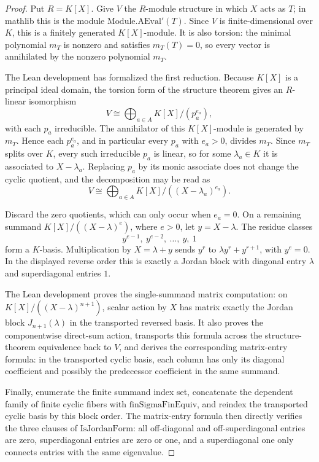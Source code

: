 \begin{proof}
  \leanok
  Put \(R=K[X]\).  Give \(V\) the \(R\)-module structure in which \(X\) acts as
  \(T\); in mathlib this is the module \( \mathrm{Module.AEval'}(T)\).  Since
  \(V\) is finite-dimensional over \(K\), this is a finitely generated
  \(K[X]\)-module.  It is also torsion: the minimal polynomial \(m_T\) is
  nonzero and satisfies \(m_T(T)=0\), so every vector is annihilated by the
  nonzero polynomial \(m_T\).

  The Lean development has formalized the first reduction.  Because \(K[X]\)
  is a principal ideal domain, the torsion form of the structure theorem gives
  an \(R\)-linear isomorphism
  \[
    V \cong \bigoplus_{a\in A} K[X]/(p_a^{e_a}),
  \]
  with each \(p_a\) irreducible.  The annihilator of this \(K[X]\)-module is
  generated by \(m_T\).  Hence each \(p_a^{e_a}\), and in particular every
  \(p_a\) with \(e_a>0\), divides \(m_T\).  Since \(m_T\) splits over \(K\),
  every such irreducible \(p_a\) is linear, so for some \(\lambda_a\in K\) it
  is associated to \(X-\lambda_a\).  Replacing \(p_a\) by its monic associate
  does not change the cyclic quotient, and the decomposition may be read as
  \[
    V \cong \bigoplus_{a\in A} K[X]/((X-\lambda_a)^{e_a}).
  \]

  Discard the zero quotients, which can only occur when \(e_a=0\).  On a
  remaining summand \(K[X]/((X-\lambda)^{e})\), where \(e>0\), let
  \(y=X-\lambda\).  The residue classes
  \[
    y^{e-1},\ y^{e-2},\ \ldots,\ y,\ 1
  \]
  form a \(K\)-basis.  Multiplication by \(X=\lambda+y\) sends
  \(y^r\) to \(\lambda y^r+y^{r+1}\), with \(y^e=0\).  In the displayed
  reverse order this is exactly a Jordan block with diagonal entry
  \(\lambda\) and superdiagonal entries \(1\).

  The Lean development proves the single-summand matrix computation: on
  \(K[X]/((X-\lambda)^{n+1})\), scalar action by \(X\) has matrix exactly the
  Jordan block \(J_{n+1}(\lambda)\) in the transported reversed basis.  It also
  proves the componentwise direct-sum action, transports this formula across
  the structure-theorem equivalence back to \(V\), and derives the corresponding
  matrix-entry formula: in the transported cyclic basis, each column has only
  its diagonal coefficient and possibly the predecessor coefficient in the same
  summand.

  Finally, enumerate the finite summand index set, concatenate the dependent
  family of finite cyclic fibers with \(\mathrm{finSigmaFinEquiv}\), and reindex
  the transported cyclic basis by this block order.  The matrix-entry formula
  then directly verifies the three clauses of \(\mathrm{IsJordanForm}\): all
  off-diagonal and off-superdiagonal entries are zero, superdiagonal entries are
  zero or one, and a superdiagonal one only connects entries with the same
  eigenvalue.
\end{proof}
